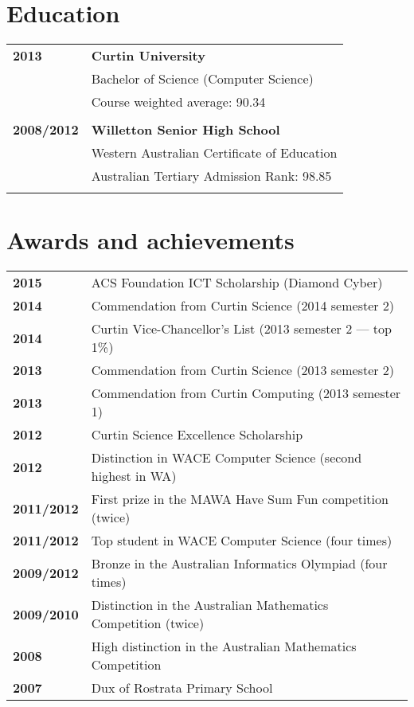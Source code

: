 \documentclass[a4paper,12pt]{article}
\begin{document}
\section*{Education}

\begin{tabular}{p{3.5cm}p{12.5cm}}
	\textbf{2013} &
		\textbf{Curtin University}\\
		& Bachelor of Science (Computer Science)\\
		& Course weighted average: 90.34\\\\
	\textbf{2008/2012} &
		\textbf{Willetton Senior High School}\\
		& Western Australian Certificate of Education\\
		& Australian Tertiary Admission Rank: 98.85\\\\
\end{tabular}

\section*{Awards and achievements}

\begin{tabular}{p{3.5cm}p{12.5cm}}
	\textbf{2015} &
		ACS Foundation ICT Scholarship (Diamond Cyber)\\
	\textbf{2014} &
		Commendation from Curtin Science (2014 semester 2)\\
	\textbf{2014} &
		Curtin Vice-Chancellor's List (2013 semester 2 --- top 1\%)\\
	\textbf{2013} &
		Commendation from Curtin Science (2013 semester 2)\\
	\textbf{2013} &
		Commendation from Curtin Computing (2013 semester 1)\\
	\textbf{2012} &
		Curtin Science Excellence Scholarship\\
	\textbf{2012} &
		Distinction in WACE Computer Science (second highest in WA)\\
	\textbf{2011/2012} &
		First prize in the MAWA Have Sum Fun competition (twice)\\
	\textbf{2011/2012} &
		Top student in WACE Computer Science (four times)\\
	\textbf{2009/2012} &
		Bronze in the Australian Informatics Olympiad (four times)\\
	\textbf{2009/2010} &
		Distinction in the Australian Mathematics Competition (twice)\\
	\textbf{2008} &
		High distinction in the Australian Mathematics Competition\\
	\textbf{2007} &
		Dux of Rostrata Primary School
\end{tabular}
\end{document}
